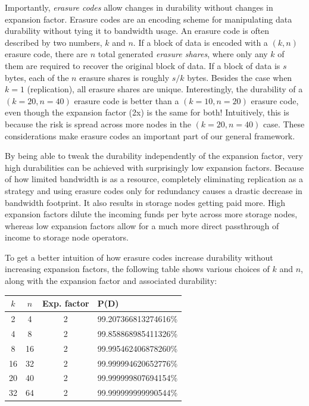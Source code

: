 \documentclass[11pt,fleqn,openany]{book}
\begin{document}
Importantly, {\em erasure
codes} allow changes in durability without changes in expansion factor.
Erasure codes are an encoding scheme for manipulating
data durability without tying it to bandwidth usage.
An erasure code is often described by two numbers, $k$ and $n$. If a block of
data is encoded with a $(k,n)$ erasure code, there are $n$ total generated {\em
erasure shares}, where only any $k$ of them are required to recover the original
block of data. If a block of data is $s$ bytes, each of the $n$ erasure shares
is roughly $s/k$ bytes. Besides the case when $k=1$ (replication), all erasure
shares are unique. Interestingly, the durability of a $(k=20,n=40)$ erasure code
is better than a $(k=10,n=20)$ erasure code, even though the expansion factor
(2x) is the same for both! Intuitively, this is because the risk is spread
across more nodes in the $(k=20,n=40)$ case. These considerations make erasure
codes an important part of our general framework.

By being able to tweak the durability independently of the expansion factor,
very high durabilities can be achieved with surprisingly low expansion factors.
Because of how limited bandwidth is as a resource, completely eliminating replication as a
strategy and using erasure codes only for redundancy causes a drastic
decrease in bandwidth footprint.
It also results in storage nodes getting paid more. High expansion factors
dilute the incoming funds per byte across more storage nodes, whereas low
expansion factors allow for a much more direct passthrough of income to
storage node operators.

To get a better intuition of how erasure codes increase durability without
increasing expansion factors, the following table shows various choices of
$k$ and $n$, along with the expansion factor and associated durability:

\begin{center}
\begin{tabular}{c c c l}
$k$ & $n$ & Exp. factor & P(D) \\ \hline
2 & 4 & 2 & 99.207366813274616\%\\
4 & 8 & 2 & 99.858868985411326\%\\
8 & 16 & 2 & 99.995462406878260\%\\
16 & 32 & 2 & 99.999994620652776\%\\
20 & 40 & 2 & 99.999999807694154\%\\
32 & 64 & 2 & 99.999999999990544\%\\
\end{tabular}
\end{center}
\end{document}
